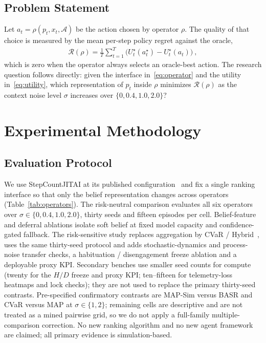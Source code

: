 \documentclass[journal]{IEEEtran}
\begin{document}
\subsection{Problem Statement}
\label{sec:problem}

Let \(a_t=\rho(p_t,x_t,\mathcal{A})\) be the action chosen by operator \(\rho\).
The quality of that choice is measured by the mean per-step policy regret against the oracle,
\begin{align}
\label{eq:regret}
\mathcal{R}(\rho)=\frac{1}{T}\sum_{t=1}^{T}\Big(U_t^\star(a_t^\star)-U_t^\star(a_t)\Big)\:,
\end{align}
which is zero when the operator always selects an oracle-best action.
The research question follows directly: given the interface in~\eqref{eq:operator} and the utility in~\eqref{eq:utility}, which representation of \(p_t\) inside \(\rho\) minimizes \(\mathcal{R}(\rho)\) as the context noise level \(\sigma\) increases over \(\{0,0.4,1.0,2.0\}\)?

\section{Experimental Methodology}
\label{sec:direction}

\subsection{Evaluation Protocol}
\label{sec:protocol}

We use StepCountJITAI at its published configuration~\cite{karine2024stepcount} and fix a single ranking interface so that only the belief representation changes across operators (Table~\ref{tab:operators}).
The risk-neutral comparison evaluates all six operators over \(\sigma\in\{0,0.4,1.0,2.0\}\), thirty seeds and fifteen episodes per cell.
Belief-feature and deferral ablations isolate soft belief at fixed model capacity and confidence-gated fallback.
The risk-sensitive study replaces aggregation by CVaR / Hybrid~\cite{rockafellar2000cvar,chow2015cvar}, uses the same thirty-seed protocol and adds stochastic-dynamics and process-noise transfer checks, a habituation / disengagement freeze ablation and a deployable proxy KPI.
Secondary benches use smaller seed counts for compute (twenty for the \(H/D\) freeze and proxy KPI; ten--fifteen for telemetry-loss heatmaps and lock checks); they are not used to replace the primary thirty-seed contrasts.
Pre-specified confirmatory contrasts are MAP-Sim versus BASR and CVaR versus MAP at \(\sigma\in\{1,2\}\); remaining cells are descriptive and are not treated as a mined pairwise grid, so we do not apply a full-family multiple-comparison correction.
No new ranking algorithm and no new agent framework are claimed; all primary evidence is simulation-based.
\end{document}
